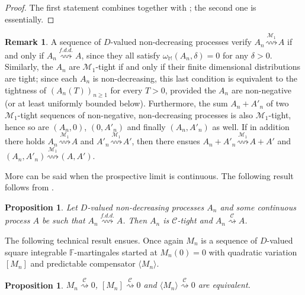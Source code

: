 \documentclass[final]{amsart}
\newtheorem{prop}[thm]{Proposition}
\theoremstyle{definition}
\newtheorem{rem}{Remark}[section]
\numberwithin{equation}{section}
\def\crochet#1{\langle #1 \rangle}
\newcommand{\dM}{\ensuremath{\mathbb{M}}}
\begin{document}
\begin{proof}
The first statement combines \citet[Corollary 13.6.1]{Whitt:2002} together with \citet[Lemma 13.6.5]{Whitt:2002};
the second one is \citet[Theorem 13.6.3]{Whitt:2002} essentially.
\end{proof}

\begin{rem}\label{rem:M1increasing} A sequence of $D$-valued non-decreasing processes verify
$A_n \stackrel{\mathcal{M}_1}{\rightsquigarrow} A$
if and only if $A_n \stackrel{f.d.d.}{\rightsquigarrow} A$, since they all satisfy $\omega_\dM(A_n,\delta)=0$ for any $\delta>0$.
Similarly, the $A_n$ are $\mathcal{M}_1$-tight if and only if their finite dimensional distributions are tight; since each $A_n$ is
non-decreasing, this last condition is equivalent to the tightness of $(A_n(T))_{n\ge 1}$ for every $T>0$, provided the $A_n$ are
non-negative (or at least uniformly bounded below). Furthermore, the
sum $A_n+A'_n$ of two $\mathcal{M}_1$-tight sequences of non-negative, non-decreasing processes is also $\mathcal{M}_1$-tight,
hence so are $(A_n,0)$, $(0,A'_n)$ and finally $(A_n,A'_n)$ as well. If in addition there holds
$A_n \stackrel{\mathcal{M}_1}{\rightsquigarrow} A$ and $A'_n \stackrel{\mathcal{M}_1}{\rightsquigarrow} A'$, then
there ensues $A_n+A'_n \stackrel{\mathcal{M}_1}{\rightsquigarrow} A+A'$ and
$(A_n,A'_n) \stackrel{\mathcal{M}_1}{\rightsquigarrow} (A,A')$.
\end{rem}

More can be said when the prospective limit is continuous. The following result follows from \citet{Remillard/Vaillancourt:2023}.

\begin{prop}\label{prop:Cincreasing}
Let $D$-valued non-decreasing processes $A_n$ and some continuous process $A$
be such that $A_n \stackrel{f.d.d.}{\rightsquigarrow} A$. Then $A_n$ is $\mathcal{C}$-tight
and $A_n \stackrel{\mathcal{C}}{\rightsquigarrow} A$.
\end{prop}

The following technical result ensues. Once again $M_n$ is a sequence of $D$-valued square integrable
$\mathbb{F}$-martingales started at $M_n(0)=0$
with quadratic variation $[M_n]$ and predictable compensator $\crochet{ M_n }$.

\begin{prop}\label{prop:Cto0}
$M_n \stackrel{\mathcal{C}}{\rightsquigarrow} 0$,
$[M_n] \stackrel{\mathcal{C}}{\rightsquigarrow} 0$ and
$\crochet{ M_n }  \stackrel{\mathcal{C}}{\rightsquigarrow} 0$ are equivalent.
\end{prop}
\end{document}
